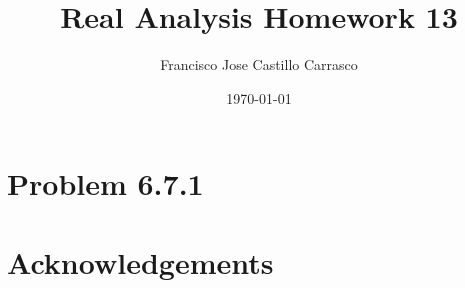 




\title{Real Analysis Homework 13}
\author{Francisco Jose Castillo Carrasco}
\date{\today}
\maketitle




\section{Problem 6.7.1}


\section*{Acknowledgements}






